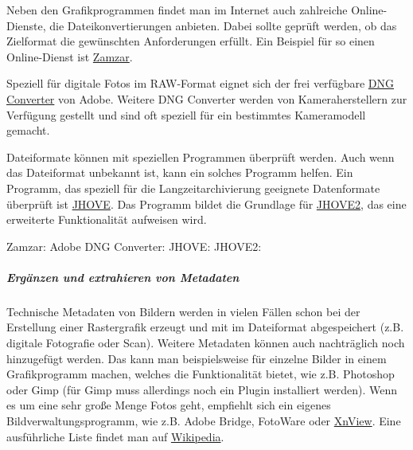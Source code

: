 Neben den Grafikprogrammen findet man im Internet auch zahlreiche Online-Dienste, die Dateikonvertierungen anbieten. Dabei sollte geprüft werden, ob das Zielformat die gewünschten Anforderungen erfüllt. Ein Beispiel für so einen Online-Dienst ist \href{http://www.zamzar.com/url/}{Zamzar}.

Speziell für digitale Fotos im RAW-Format eignet sich der frei verfügbare \href{http://www.adobe.com/products/photoshop/extend.displayTab2.html#downloads}{DNG Converter} von Adobe. Weitere DNG Converter werden von Kameraherstellern zur Verfügung gestellt und sind oft speziell für ein bestimmtes Kameramodell gemacht. 

Dateiformate können mit speziellen Programmen überprüft werden. Auch wenn das Dateiformat unbekannt ist, kann ein solches Programm helfen. Ein Programm, das speziell für die Langzeitarchivierung geeignete Datenformate überprüft ist \href{http://sourceforge.net/projects/jhove/}{JHOVE}. Das Programm bildet die Grundlage für \href{https://bitbucket.org/jhove2/main/wiki/Home}{JHOVE2}, das eine erweiterte Funktionalität aufweisen wird.

\begin{flushleft}
	Zamzar: \linebreak
	Adobe DNG Converter: \linebreak
	JHOVE: \linebreak
	JHOVE2:
\end{flushleft}

\subparagraph{Ergänzen und extrahieren von Metadaten}
Technische Metadaten von Bildern werden in vielen Fällen schon bei der Erstellung einer Rastergrafik erzeugt und mit im Dateiformat abgespeichert (z.B. digitale Fotografie oder Scan). Weitere Metadaten können auch nachträglich noch hinzugefügt werden. Das kann man beispielsweise für einzelne Bilder in einem Grafikprogramm machen, welches die Funktionalität bietet, wie z.B. Photoshop oder Gimp (für Gimp muss allerdings noch ein Plugin installiert werden). Wenn es um eine sehr große Menge Fotos geht, empfiehlt sich ein eigenes Bildverwaltungsprogramm, wie z.B. Adobe Bridge, FotoWare oder \href{http://www.xnview.com/}{XnView}. Eine ausführliche Liste findet man auf \href{http://de.wikipedia.org/wiki/Bilderverwaltung\#Software}{Wikipedia}.

